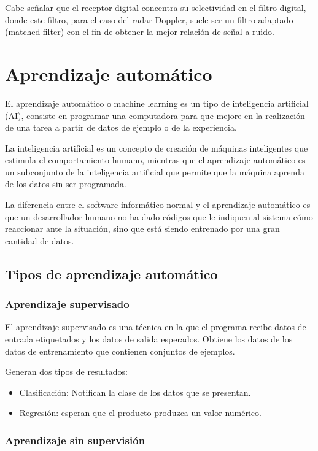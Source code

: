 Cabe señalar que el receptor digital concentra su selectividad en el filtro digital, donde este filtro, para el caso del radar Doppler, suele ser un filtro adaptado (matched filter) con el fin de obtener la mejor relación de señal a ruido.


\section{Aprendizaje automático}

El aprendizaje automático o machine learning es un tipo de inteligencia artificial (AI),
consiste en programar una computadora para que mejore en la realización de una tarea a partir de datos de ejemplo o de la experiencia.

La inteligencia artificial es un concepto de creación de máquinas inteligentes que estimula el comportamiento humano, mientras que el aprendizaje automático es un subconjunto de la inteligencia artificial que permite que la máquina aprenda de los datos sin ser programada.

La diferencia entre el software informático normal y el aprendizaje automático es que un desarrollador humano no ha dado códigos que le indiquen al sistema cómo reaccionar ante la situación, sino que está siendo entrenado por una gran cantidad de datos.

\subsection{Tipos de aprendizaje automático}

\subsubsection{Aprendizaje supervisado}

El aprendizaje supervisado es una técnica en la que el programa recibe datos de entrada etiquetados y los datos de salida esperados. Obtiene los datos de los datos de entrenamiento que contienen conjuntos de ejemplos. 

Generan dos tipos de resultados:
\begin{itemize}
\item Clasificación: Notifican la clase de los datos que se presentan.
\item Regresión: esperan que el producto produzca un valor numérico.
\end{itemize}
 
\subsubsection{Aprendizaje sin supervisión}

